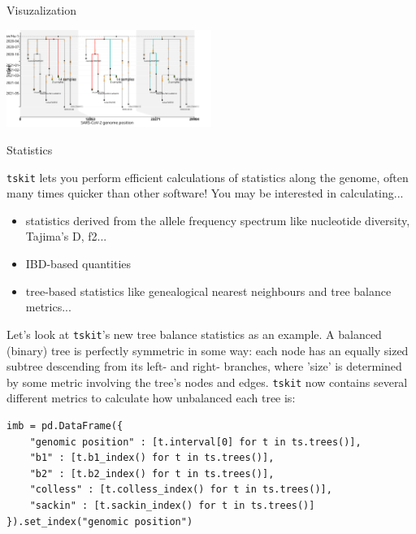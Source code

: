 \documentclass[landscape,a0paper,fontscale=0.4]{baposter}
\newcommand{\tskit}{{\texttt{tskit}}}
\newcommand{\compresslist}{%
 \setlength{\itemsep}{1pt}%
 \setlength{\parskip}{0pt}%
 \setlength{\parsep}{0pt}%
 }
\begin{document}
\begin{poster}
\begin{posterbox}[name=viz,column=1,row=0,span=2,below=overview]{Visuzalization}
\begin{multicols}{2}
\includegraphics[width=0.5\textwidth]{Covid_recombination}

\end{multicols}

\end{posterbox}



\begin{posterbox}[name=stats,column=3,row=0,span=1]{Statistics}

\tskit{} lets you perform efficient calculations of statistics along the genome, often many times quicker than other software! You may be interested in calculating...

\begin{itemize} \compresslist
    \item statistics derived from the allele frequency spectrum like nucleotide diversity, Tajima's D, f2...
    \item IBD-based quantities
    \item tree-based statistics like genealogical nearest neighbours and tree balance metrics...
\end{itemize}

Let's look at \tskit{}'s new tree balance statistics as an example. A balanced
    (binary) tree is perfectly symmetric in some way: each node has an equally
    sized subtree descending from its left- and right- branches, where 'size'
    is determined by some metric involving the tree's nodes and edges. \tskit
    now contains several different metrics to calculate how unbalanced each
    tree is:

\begin{verbatim}
imb = pd.DataFrame({
    "genomic position" : [t.interval[0] for t in ts.trees()],
    "b1" : [t.b1_index() for t in ts.trees()],
    "b2" : [t.b2_index() for t in ts.trees()],
    "colless" : [t.colless_index() for t in ts.trees()],
    "sackin" : [t.sackin_index() for t in ts.trees()]
}).set_index("genomic position")


\end{verbatim}
\end{posterbox}
\end{poster}
\end{document}

